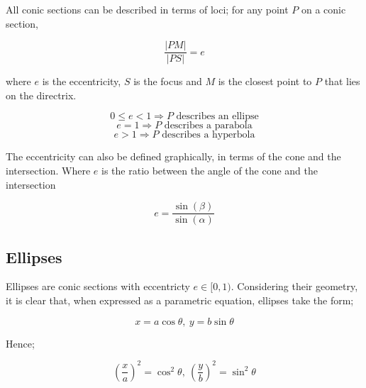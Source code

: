 \documentclass{article}
\begin{document}
All conic sections can be described in terms of loci; for any point $P$ on a
conic section,

\[\frac{|PM|}{|PS|} = e\]

\noindent where $e$ is the eccentricity, $S$ is the focus and $M$ is the closest point to
$P$ that lies on the directrix.

\[0 \leq e < 1 \Rightarrow P \textrm{ describes an ellipse}\]
\[e = 1 \Rightarrow P \textrm{ describes a parabola}\]
\[e > 1 \Rightarrow P \textrm{ describes a hyperbola}\]

\begin{multicols}{2}

\vspace{20pt}

\begin{center}

\end{center}

\noindent The eccentricity can also be defined graphically, in terms of the cone and the intersection. Where \(e\) is the ratio between the angle of the cone and the intersection

\[e=\frac{\sin\left(\beta\right)}{\sin\left(\alpha\right)}\]

\end{multicols}


\subsection{Ellipses}

Ellipses are conic sections with eccentricty $e \in [0,1)$. Considering their
geometry, it is clear that, when expressed as a parametric equation, ellipses
take the form;

\[x = a\cos\theta,\: y = b\sin\theta\]

\noindent Hence;

\[\left(\frac{x}{a}\right)^2 = \cos^2\theta,\: \left(\frac{y}{b}\right)^2 =
\sin^2\theta\]
\end{document}
